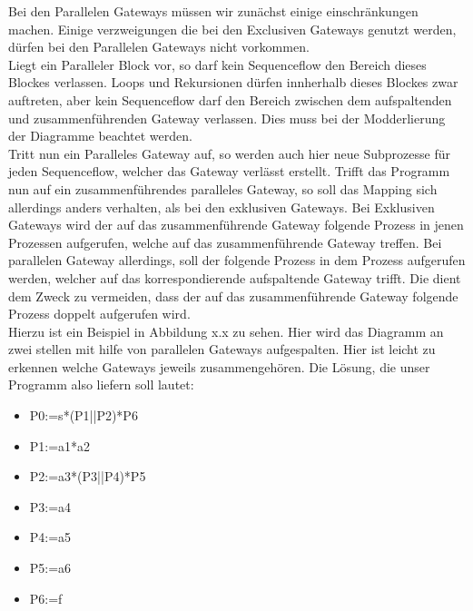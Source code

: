 Bei den Parallelen Gateways müssen wir zunächst einige einschränkungen machen. Einige verzweigungen die bei den Exclusiven Gateways genutzt werden, dürfen bei den Parallelen Gateways nicht vorkommen.\\
Liegt ein Paralleler Block vor, so darf kein Sequenceflow den Bereich dieses Blockes verlassen. Loops und Rekursionen dürfen innherhalb dieses Blockes zwar auftreten, aber kein Sequenceflow darf den Bereich zwischen dem aufspaltenden und zusammenführenden Gateway verlassen. Dies muss bei der Modderlierung der Diagramme beachtet werden.\\
Tritt nun ein Paralleles Gateway auf, so werden auch hier neue Subprozesse für jeden Sequenceflow, welcher das Gateway verlässt erstellt. Trifft das Programm nun auf ein zusammenführendes paralleles Gateway, so soll das Mapping sich allerdings anders verhalten, als bei den exklusiven Gateways. Bei Exklusiven Gateways wird der auf das zusammenführende Gateway folgende Prozess in jenen Prozessen aufgerufen, welche auf das zusammenführende Gateway treffen. Bei parallelen Gateway allerdings, soll der folgende Prozess in dem Prozess aufgerufen werden, welcher auf das korrespondierende aufspaltende Gateway trifft. Die dient dem Zweck zu vermeiden, dass der auf das zusammenführende Gateway folgende Prozess doppelt aufgerufen wird.\\
Hierzu ist ein Beispiel in Abbildung x.x zu sehen. Hier wird das Diagramm an zwei stellen mit hilfe von parallelen Gateways aufgespalten. Hier ist leicht zu erkennen welche Gateways jeweils zusammengehören. Die Lösung, die unser Programm also liefern soll lautet:\\
\begin{itemize}
\item P0:=s*(P1||P2)*P6
\item P1:=a1*a2
\item P2:=a3*(P3||P4)*P5
\item P3:=a4
\item P4:=a5
\item P5:=a6
\item P6:=f
\end{itemize}




